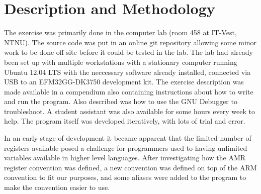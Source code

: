 \chapter{Description and Methodology}

The exercise was primarily done in the computer lab (room 458 at IT-Vest, NTNU). The source code was put in an online git repository allowing some minor work to be done off-site before it could be tested in the lab.
The lab had already been set up with multiple workstations with a stationary computer running Ubuntu 12.04 LTS with the neccessary software already installed, connected via USB to an EFM32GG-DK3750 development kit.
The exercise description was made available in a compendium also containing instructions about how to write and run the program. Also described was how to use the GNU Debugger to troubleshoot. A student assistant was also available for some hours every week to help.
The program itself was developed iteratively, with lots of trial and error.

In an early stage of development it became apparent that the limited number of registers available posed a challenge for programmers used to having unlimited variables available in higher level languages.
After investigating how the AMR register convention was defined, a new convention was defined on top of the ARM convention to fit our purposes, and some aliases were added to the program to make the convention easier to use.

